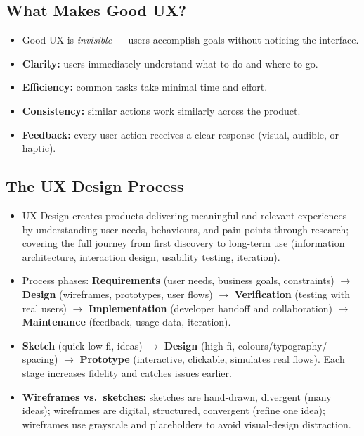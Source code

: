 \documentclass[hidelinks]{article}
\begin{document}
\subsection{What Makes Good UX?}
\begin{itemize}
  \item Good UX is \emph{invisible} --- users accomplish goals without noticing the interface.
  \item \textbf{Clarity:} users immediately understand what to do and where to go.
  \item \textbf{Efficiency:} common tasks take minimal time and effort.
  \item \textbf{Consistency:} similar actions work similarly across the product.
  \item \textbf{Feedback:} every user action receives a clear response (visual, audible, or haptic).
\end{itemize}

\subsection{The UX Design Process}
\begin{itemize}
  \item UX Design creates products delivering meaningful and relevant experiences by understanding
        user needs, behaviours, and pain points through research; covering the full journey from
        first discovery to long-term use (information architecture, interaction design, usability
        testing, iteration).
  \item Process phases: \textbf{Requirements} (user needs, business goals, constraints) $\to$
        \textbf{Design} (wireframes, prototypes, user flows) $\to$ \textbf{Verification} (testing
        with real users) $\to$ \textbf{Implementation} (developer handoff and collaboration) $\to$
        \textbf{Maintenance} (feedback, usage data, iteration).
  \item \textbf{Sketch} (quick low-fi, ideas) $\to$ \textbf{Design} (high-fi, colours/typography/
        spacing) $\to$ \textbf{Prototype} (interactive, clickable, simulates real flows). Each stage
        increases fidelity and catches issues earlier.
  \item \textbf{Wireframes vs.\ sketches:} sketches are hand-drawn, divergent (many ideas);
        wireframes are digital, structured, convergent (refine one idea); wireframes use grayscale
        and placeholders to avoid visual-design distraction.
\end{itemize}
\end{document}
